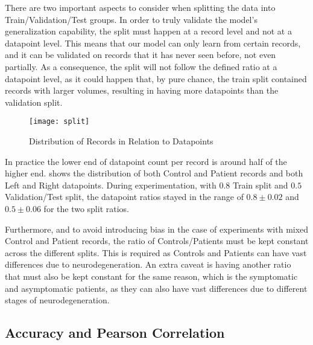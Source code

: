 There are two important aspects to consider when splitting the data into Train/Validation/Test groups. In order to truly validate the model's generalization capability, the split must happen at a record level and not at a datapoint level. This means that our model can only learn from certain records, and it can be validated on records that it has never seen before, not even partially. As a consequence, the split will not follow the defined ratio at a datapoint level, as it could happen that, by pure chance, the train split contained records with larger volumes, resulting in having more datapoints than the validation split.
\begin{figure}[H]
\centering
\texttt{[image: split]}
\caption{Distribution of Records in Relation to Datapoints}
\label{fig:hist_split}
\end{figure}
In practice the lower end of datapoint count per record is around half of the higher end.  shows the distribution of both Control and Patient records and both Left and Right datapoints. During experimentation, with $0.8$ Train split and $0.5$ Validation/Test split, the datapoint ratios stayed in the range of $0.8\pm0.02$ and $0.5\pm0.06$ for the two split ratios.\par
Furthermore, and to avoid introducing bias in the case of experiments with mixed Control and Patient records, the ratio of Controls/Patients must be kept constant across the different splits. This is required as Controls and Patients can have vast differences due to neurodegeneration. An extra caveat is having another ratio that must also be kept constant for the same reason, which is the symptomatic and asymptomatic patients, as they can also have vast differences due to different stages of neurodegeneration.

\subsection{Accuracy and Pearson Correlation}
\label{sec:eval}

